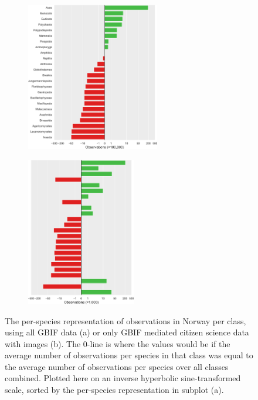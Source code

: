 \documentclass{article}
\begin{document}
\begin{figure}
  \centering
  \begin{subfigure}[b]{0.4\textwidth}
      \centering
      \includegraphics[height=6.5cm]{1a}
      \caption{}
      \label{fig:bias_a}
  \end{subfigure}
  \hfill
  \begin{subfigure}[b]{0.4\textwidth}
      \centering
      \includegraphics[height=6.5cm]{1b}
      \caption{}
      \label{fig:bias_b}
  \end{subfigure}

 \caption{\footnotesize The per-species representation of observations in Norway per class, using all GBIF data (a) or only GBIF mediated citizen science data with images (b). The 0-line is where the values would be if the average number of observations per species in that class was equal to the average number of observations per species over all classes combined. Plotted here on an inverse hyperbolic sine-transformed scale, sorted by the per-species representation in subplot (a).}
     \label{fig:bias}
\end{figure}
\end{document}

